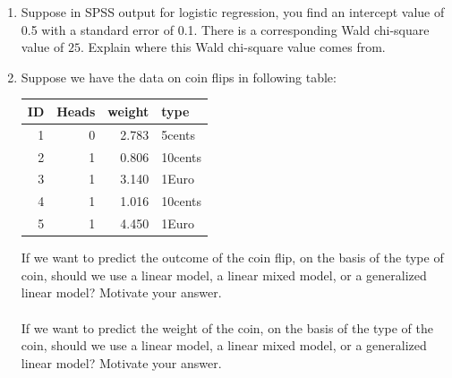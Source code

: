 \documentclass[]{report}\usepackage[]{graphicx}\usepackage[]{color}
\newenvironment{knitrout}{}{} %
\begin{document}
\begin{enumerate}
\item
Suppose in SPSS output for logistic regression, you find an intercept value of 0.5 with a standard error of 0.1. There is a corresponding Wald chi-square value of $25$. Explain where this Wald chi-square value comes from.

\item

Suppose we have the data on coin flips in following table:

\begin{knitrout}
\color{fgcolor}
\begin{tabular}{r|r|r|l}
\hline
ID & Heads & weight & type\\
\hline
1 & 0 & 2.783 & 5cents\\
\hline
2 & 1 & 0.806 & 10cents\\
\hline
3 & 1 & 3.140 & 1Euro\\
\hline
4 & 1 & 1.016 & 10cents\\
\hline
5 & 1 & 4.450 & 1Euro\\
\hline
\end{tabular}


\end{knitrout}

If we want to predict the outcome of the coin flip, on the basis of the type of coin, should we use a linear model, a linear mixed model, or a generalized linear model? Motivate your answer.
\\
\\
If we want to predict the weight of the coin, on the basis of the type of the coin, should we use a linear model, a linear mixed model, or a generalized linear model? Motivate your answer.


\end{enumerate}
\end{document}
